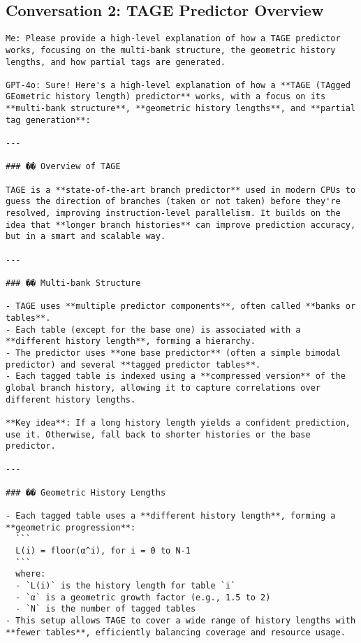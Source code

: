 \documentclass[11pt]{article}
\begin{document}
\subsection{Conversation 2: TAGE Predictor Overview}
\begin{Verbatim}[fontsize=\tiny, breaklines=true]
Me: Please provide a high-level explanation of how a TAGE predictor works, focusing on the multi-bank structure, the geometric history lengths, and how partial tags are generated.

GPT-4o: Sure! Here's a high-level explanation of how a **TAGE (TAgged GEometric history length) predictor** works, with a focus on its **multi-bank structure**, **geometric history lengths**, and **partial tag generation**:

---

### �� Overview of TAGE

TAGE is a **state-of-the-art branch predictor** used in modern CPUs to guess the direction of branches (taken or not taken) before they're resolved, improving instruction-level parallelism. It builds on the idea that **longer branch histories** can improve prediction accuracy, but in a smart and scalable way.

---

### �� Multi-bank Structure

- TAGE uses **multiple predictor components**, often called **banks or tables**.
- Each table (except for the base one) is associated with a **different history length**, forming a hierarchy.
- The predictor uses **one base predictor** (often a simple bimodal predictor) and several **tagged predictor tables**.
- Each tagged table is indexed using a **compressed version** of the global branch history, allowing it to capture correlations over different history lengths.

**Key idea**: If a long history length yields a confident prediction, use it. Otherwise, fall back to shorter histories or the base predictor.

---

### �� Geometric History Lengths

- Each tagged table uses a **different history length**, forming a **geometric progression**:
  ```
  L(i) = floor(α^i), for i = 0 to N-1
  ```
  where:
  - `L(i)` is the history length for table `i`
  - `α` is a geometric growth factor (e.g., 1.5 to 2)
  - `N` is the number of tagged tables
- This setup allows TAGE to cover a wide range of history lengths with **fewer tables**, efficiently balancing coverage and resource usage.


\end{Verbatim}
\end{document}
